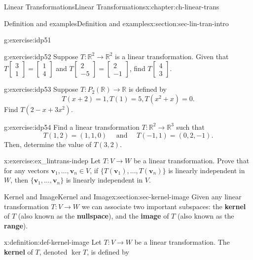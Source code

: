 \documentclass[oneside,10pt,]{book}
\newcommand{\terminology}[1]{\textbf{#1}}
\numberwithin{equation}{section}
\newcommand{\bbm}{\begin{bmatrix}}
\newcommand{\ebm}{\end{bmatrix}}
\newcommand{\R}{\mathbb{R}}
\newcommand{\vv}{\mathbf{v}}
\begin{document}
\begin{chapterptx}{Linear Transformations}{}{Linear Transformations}{}{}{x:chapter:ch-linear-trans}
\begin{sectionptx}{Definition and examples}{}{Definition and examples}{}{}{x:section:sec-lin-tran-intro}
\begin{inlineexercise}{}{g:exercise:idp51}
\end{inlineexercise}%
\begin{inlineexercise}{}{g:exercise:idp52}%
Suppose \(T:\R^2\to \R^2\) is a linear transformation. Given that \(T\bbm 3\\1\ebm = \bbm 1\\4\ebm\) and \(T\bbm 2\\-5\ebm = \bbm 2\\-1\ebm\), find \(T\bbm 4\\3\ebm\).%
\end{inlineexercise}%
\begin{inlineexercise}{}{g:exercise:idp53}%
Suppose \(T:P_2(\R)\to \R\) is defined by%
\begin{equation*}
T(x+2)=1, T(1)=5, T(x^2+x)=0.
\end{equation*}
Find \(T(2-x+3x^2)\).%
\end{inlineexercise}%
\begin{inlineexercise}{}{g:exercise:idp54}%
Find a linear transformation \(T:\R^2\to \R^3\) such that%
\begin{equation*}
T(1,2)=(1,1,0) \quad \text{ and } \quad T(-1,1) = (0,2,-1)\text{.}
\end{equation*}
Then, determine the value of \(T(3,2)\).%
\end{inlineexercise}%
\begin{inlineexercise}{}{x:exercise:ex_lintrans-indep}%
Let \(T:V\to W\) be a linear transformation. Prove that for any vectors \(\vv_1,\ldots, \vv_n\in V\), if \(\{T(\vv_1),\ldots, T(\vv_n)\}\) is linearly independent in \(W\), then \(\{\vv_1,\ldots, \vv_n\}\) is linearly independent in \(V\).%
\end{inlineexercise}%
\end{sectionptx}
%
%
\typeout{************************************************}
\typeout{************************************************}
%
\begin{sectionptx}{Kernel and Image}{}{Kernel and Image}{}{}{x:section:sec-kernel-image}
Given any linear transformation \(T:V\to W\) we can associate two important subspaces: the \terminology{kernel} of \(T\) (also known as the \terminology{nullspace}), and the \terminology{image} of \(T\) (also known as the \terminology{range}).%
\begin{definition}{}{x:definition:def-kernel-image}%
Let \(T:V\to W\) be a linear transformation. The \terminology{kernel} of \(T\), denoted \(\ker T\), is defined by%
\begin{equation*}

\end{equation*}
\end{definition}
\end{sectionptx}
\end{chapterptx}
\end{document}
